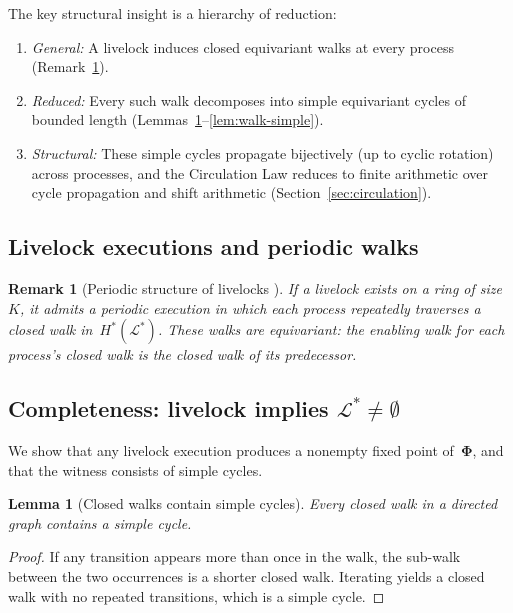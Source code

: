 \documentclass{article}
\newtheorem{lemma}[theorem]{Lemma}
\newtheorem{remark}{Remark}
\newcommand{\Ls}{\mathcal{L}^{*}}
\newcommand{\bPhi}{\boldsymbol{\Phi}}
\newcommand{\Hstar}{H^{*}}
\begin{document}
The key structural insight is a hierarchy of reduction:
\begin{enumerate}
  \item[\textbf{Level~1.}] \emph{General:} A livelock induces
    closed equivariant walks at every process
    (Remark~\ref{rem:periodic}).
  \item[\textbf{Level~2.}] \emph{Reduced:} Every such walk
    decomposes into simple equivariant cycles of bounded length
    (Lemmas~\ref{lem:decompose}--\ref{lem:walk-simple}).
  \item[\textbf{Level~3.}] \emph{Structural:} These simple cycles
    propagate bijectively (up to cyclic rotation) across processes,
    and the Circulation Law reduces to finite arithmetic over
    cycle propagation and shift arithmetic
    (Section~\ref{sec:circulation}).
\end{enumerate}

\subsection{Livelock executions and periodic walks}

\begin{remark}[Periodic structure of livelocks {\citep{klinkhamer2019}}]\label{rem:periodic}
If a livelock exists on a ring of size~$K$, it admits
a periodic execution in which each process repeatedly
traverses a closed walk in~$\Hstar(\Ls)$.
These walks are \emph{equivariant}: the enabling walk for
each process's closed walk is the closed walk of its
predecessor.
\end{remark}

\subsection{Completeness: livelock implies
\texorpdfstring{$\Ls \neq \emptyset$}{L* nonempty}}

We show that any livelock execution produces a nonempty
fixed point of~$\bPhi$, and that the witness consists of
simple cycles.

\begin{lemma}[Closed walks contain simple cycles]
\label{lem:decompose}
Every closed walk in a directed graph contains a simple cycle.
\end{lemma}

\begin{proof}
If any transition appears more than once in the walk, the
sub-walk between the two occurrences is a shorter closed walk.
Iterating yields a closed walk with no repeated transitions,
which is a simple cycle.
\end{proof}
\end{document}

